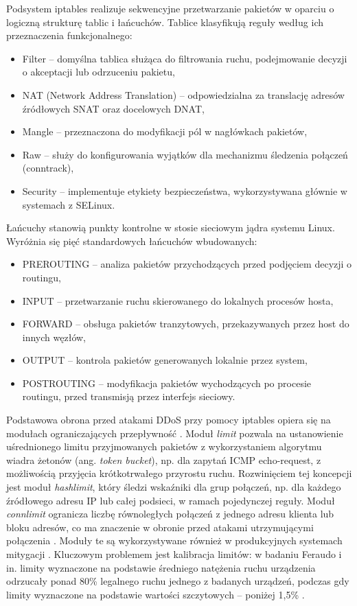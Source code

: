 \documentclass[a4paper,12pt]{article}
\begin{document}
Podsystem iptables realizuje sekwencyjne przetwarzanie pakietów w oparciu o logiczną strukturę tablic i łańcuchów. Tablice klasyfikują reguły według ich przeznaczenia funkcjonalnego:

\begin{itemize}
    \item Filter -- domyślna tablica służąca do filtrowania ruchu, podejmowanie decyzji o akceptacji lub odrzuceniu pakietu,
    \item NAT (Network Address Translation) -- odpowiedzialna za translację adresów źródłowych SNAT oraz docelowych DNAT,
    \item Mangle -- przeznaczona do modyfikacji pól w nagłówkach pakietów,
    \item Raw -- służy do konfigurowania wyjątków dla mechanizmu śledzenia połączeń (conntrack),
    \item Security -- implementuje etykiety bezpieczeństwa, wykorzystywana głównie w systemach z SELinux.
\end{itemize}

Łańcuchy stanowią punkty kontrolne w stosie sieciowym jądra systemu Linux. Wyróżnia się pięć standardowych łańcuchów wbudowanych:

\begin{itemize}
    \item PREROUTING -- analiza pakietów przychodzących przed podjęciem decyzji o routingu,
    \item INPUT -- przetwarzanie ruchu skierowanego do lokalnych procesów hosta,
    \item FORWARD -- obsługa pakietów tranzytowych, przekazywanych przez host do innych węzłów,
    \item OUTPUT -- kontrola pakietów generowanych lokalnie przez system,
    \item POSTROUTING -- modyfikacja pakietów wychodzących po procesie routingu, przed transmisją przez interfejs sieciowy.
\end{itemize}
Podstawowa obrona przed atakami DDoS przy pomocy iptables opiera się na modułach ograniczających przepływność \cite{iptables_ext}. Moduł \textit{limit} pozwala na ustanowienie uśrednionego limitu przyjmowanych pakietów z wykorzystaniem algorytmu wiadra żetonów (ang. \textit{token bucket}), np. dla zapytań ICMP echo-request, z możliwością przyjęcia krótkotrwałego przyrostu ruchu. Rozwinięciem tej koncepcji jest moduł \textit{hashlimit}, który śledzi wskaźniki dla grup połączeń, np. dla każdego źródłowego adresu IP lub całej podsieci, w ramach pojedynczej reguły. Moduł \textit{connlimit} ogranicza liczbę równoległych połączeń z jednego adresu klienta lub bloku adresów, co ma znaczenie w obronie przed atakami utrzymującymi połączenia \cite{iptables_ext}. Moduły te są wykorzystywane również w produkcyjnych systemach mitygacji \cite{majkowski2017gatebot}. Kluczowym problemem jest kalibracja limitów: w badaniu Feraudo i in. limity wyznaczone na podstawie średniego natężenia ruchu urządzenia odrzucały ponad 80\% legalnego ruchu jednego z badanych urządzeń, podczas gdy limity wyznaczone na podstawie wartości szczytowych -- poniżej 1,5\% \cite{feraudo2024mitigating}.
\end{document}
